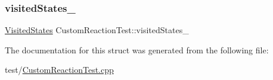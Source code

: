 \mbox{\label{struct_custom_reaction_test_ac7fc5badec18ca81d108fe608fab7cc9}} 
\subsubsection{\texorpdfstring{visited\+States\+\_\+}{visitedStates\_}}
{\footnotesize\ttfamily \mbox{\hyperlink{struct_custom_reaction_test_aeb9e297d55868cf2eeca6f76f049fa1a}{Visited\+States}} Custom\+Reaction\+Test\+::visited\+States\+\_\+\hspace{0.3cm}{\ttfamily [private]}}



The documentation for this struct was generated from the following file\+:\begin{DoxyCompactItemize}
\item 
test/\mbox{\hyperlink{_custom_reaction_test_8cpp}{Custom\+Reaction\+Test.\+cpp}}\end{DoxyCompactItemize}
